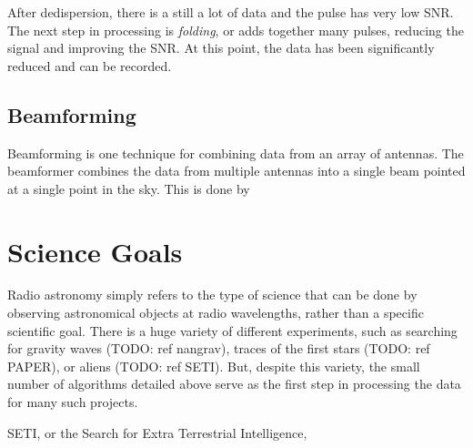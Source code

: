 After dedispersion, there is a still a lot of data and the pulse has very low SNR. 
The next step in processing is \emph{folding}, or adds together many pulses, reducing the signal and improving the SNR.
At this point, the data has been significantly reduced and can be recorded. 


%
\subsection{Beamforming}
Beamforming is one technique for combining data from an array of antennas.
The beamformer combines the data from multiple antennas into a single beam pointed at a single point in the sky.
This is done by 


\section{Science Goals}
Radio astronomy simply refers to the type of science that can be done by observing astronomical objects at radio wavelengths, rather than a specific scientific goal. 
There is a huge variety of different experiments, such as searching for gravity waves (TODO: ref nangrav), traces of the first stars (TODO: ref PAPER), or aliens (TODO: ref SETI).
But, despite this variety, the small number of algorithms detailed above serve as the first step in processing the data for many such projects.

SETI, or the Search for Extra Terrestrial Intelligence, 

